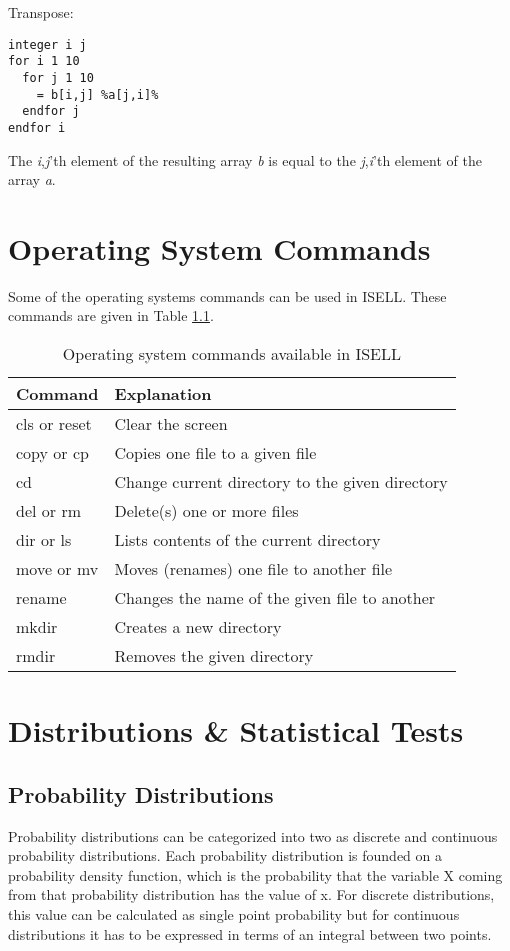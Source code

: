 \documentclass[a4paper,12pt]{book}
\begin{document}
\noindent
Transpose:
\begin{verbatim}
integer i j
for i 1 10
  for j 1 10
    = b[i,j] %a[j,i]%
  endfor j
endfor i
\end{verbatim}
The \textsl{i},\textsl{j}'th element of the resulting array \textsl{b} is equal to the \textsl{j},\textsl{i}'th element of the array \textsl{a}.

\chapter{Operating System Commands}

Some of the operating systems commands can be used in ISELL. These commands are given in Table \ref{shell-commands}.

\begin{table}[ht]
\label{shell-commands}
\caption{Operating system commands available in ISELL}
\begin{tabular}{ll}
\hline
Command & Explanation \\
\hline
cls or reset & Clear the screen\\
copy or cp & Copies one file to a given file \\
cd & Change current directory to the given directory \\
del or rm & Delete(s) one or more files \\ 
dir or ls & Lists contents of the current directory \\
move or mv & Moves (renames) one file to another file \\
rename & Changes the name of the given file to another \\
mkdir & Creates a new directory \\
rmdir & Removes the given directory \\
\hline
\end{tabular}
\end{table}

\chapter{Distributions \& Statistical Tests}

\section{Probability Distributions}
Probability distributions can be categorized into two as discrete and continuous probability distributions. Each probability distribution is founded on a probability density function, which is the probability that the variable X coming from that probability distribution has the value of x. For discrete distributions, this value can be calculated as single point probability but for continuous distributions it has to be expressed in terms of an integral between two points.
\end{document}
